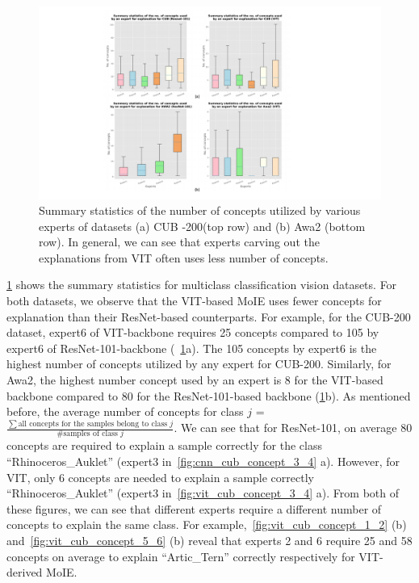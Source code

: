 \begin{figure}[h]
\centering
\includegraphics[width=1\textwidth]{figures/Supp/Summary_stats_vit_resnet.pdf}
\caption{Summary statistics of the number of concepts utilized by various experts of datasets (a) CUB -200(top row) and (b) Awa2 (bottom row). In general, we can see that experts carving out the explanations from VIT often uses less number of concepts.}
\label{fig:stats_ex_cub}
\end{figure}



\cref{fig:stats_ex_cub} shows the summary statistics for multiclass classification vision datasets. For both datasets, we observe that the VIT-based MoIE uses fewer concepts for explanation than their ResNet-based counterparts. For example, for the CUB-200 dataset, expert6 of VIT-backbone requires 25 concepts compared to 105 by expert6 of ResNet-101-backbone (~\cref{fig:stats_ex_cub}a). The 105 concepts by expert6 is the highest number of concepts utilized by any expert for CUB-200. Similarly, for Awa2, the highest number concept used by an expert is 8 for the VIT-based backbone compared to 80 for the ResNet-101-based backbone (\cref{fig:stats_ex_cub}b).
As mentioned before, the average number of concepts for class $j$ = $\frac{\sum\text{all concepts for the samples belong to class $j$}}{\text{\# samples of class $j$}}$. We can see that for ResNet-101, on average 80 concepts are required to explain a sample correctly for the class ``Rhinoceros\_Auklet'' (expert3 in~\cref{fig:cnn_cub_concept_3_4} a). However, for VIT, only 6 concepts are needed to explain a sample correctly ``Rhinoceros\_Auklet'' (expert3  in~\cref{fig:vit_cub_concept_3_4} a). From both of these figures, we can see that different experts require a different number of concepts to explain the same class. For example,~\cref{fig:vit_cub_concept_1_2}  (b) and~\cref{fig:vit_cub_concept_5_6} (b) reveal that experts 2 and 6 require 25 and 58 concepts on average to explain ``Artic\_Tern'' correctly respectively for VIT-derived MoIE.


